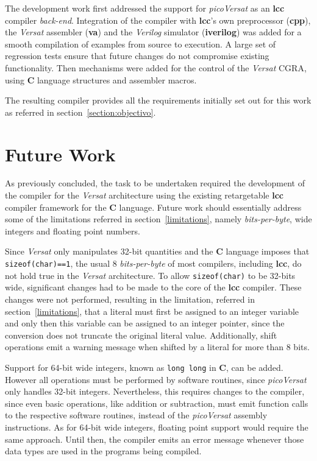 The development work first addressed the support for {\it picoVersat} as an
{\bf lcc} compiler {\it back-end}.
Integration of the compiler with {\bf lcc}'s own preprocessor ({\bf cpp}),
the {\it Versat} assembler ({\bf va}) and the {\it Verilog} simulator
({\bf iverilog}) was added for a smooth compilation of examples from source
to execution.
A large set of regression tests ensure that future changes do not compromise
existing functionality.
Then mechanisms were added for the control of the {\it Versat} {\sc CGRA},
using {\bf C} language structures and assembler macros.

The resulting compiler provides all the requirements initially set out for
this work as referred in section~\ref{section:objectivo}.

\section{Future Work}
\label{section:futuro}

As previously concluded, the task to be undertaken required the development of
the compiler for the {\it Versat} architecture using the existing retargetable
{\bf lcc} compiler framework for the {\bf C} language.  Future work should
essentially address some of the limitations referred in
section~\ref{limitations}, namely {\it bits-per-byte}, wide integers and
floating point numbers.

Since {\it Versat} only manipulates 32-bit quantities and the {\bf C} language
imposes that {\tt sizeof(char)==1}, the usual 8 {\it bits-per-byte} of most
compilers, including {\bf lcc}, do not hold true in the {\it Versat}
architecture. To allow {\tt sizeof(char)} to be 32-bits wide, significant
changes had to be made to the core of the {\bf lcc} compiler. These changes were
not performed, resulting in the limitation, referred in
section~\ref{limitations}, that a literal must first be assigned to an integer
variable and only then this variable can be assigned to an integer pointer,
since the conversion does not truncate the original literal value.
Additionally, shift operations emit a warning message when shifted by a literal
for more than 8 bits.

Support for 64-bit wide integers, known as {\tt long long} in {\bf C}, can be
added. However all operations must be performed by software routines, since {\it
  picoVersat} only handles 32-bit integers. Nevertheless, this requires changes
to the compiler, since even basic operations, like addition or subtraction, must
emit function calls to the respective software routines, instead of the {\it
  picoVersat} assembly instructions.  As for 64-bit wide integers, floating
point support would require the same approach.  Until then, the compiler emits
an error message whenever those data types are used in the programs being
compiled.

\cleardoublepage

